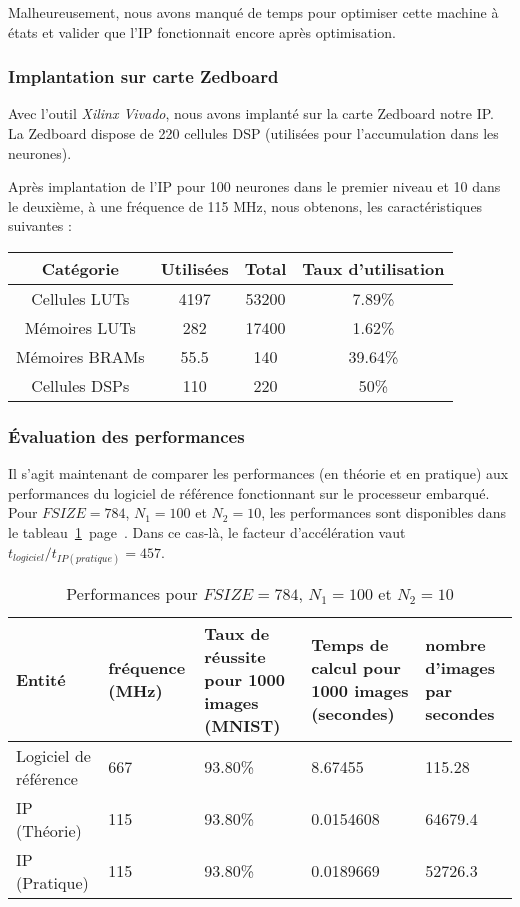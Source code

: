 Malheureusement, nous avons manqué de temps pour optimiser cette machine à états
et valider que l'IP fonctionnait encore après optimisation.

\subsubsection{Implantation sur carte Zedboard}

Avec l'outil {\em Xilinx Vivado}, nous avons implanté sur la carte Zedboard notre IP.
La Zedboard dispose de 220 cellules DSP (utilisées pour l'accumulation dans les neurones).

Après implantation de l'IP pour 100 neurones dans le premier niveau et 10 dans le deuxième,
à une fréquence de 115 MHz, nous obtenons, les caractéristiques suivantes :

\begin{table}[h!]
	\centering
	\begin{tabular}{|c|c|c|c|}
		\hline
		Catégorie & Utilisées & Total & Taux d'utilisation\\
		\hline
		Cellules LUTs & 4197 & 53200 & 7.89\% \\
		Mémoires LUTs & 282 & 17400 & 1.62\% \\
		Mémoires BRAMs & 55.5 & 140 & 39.64\% \\
		Cellules DSPs & 110 & 220 & 50\% \\
		\hline
	\end{tabular}
\end{table}


\subsubsection{\'{E}valuation des performances}

Il s'agit maintenant de comparer les performances (en théorie et en pratique)
aux performances du logiciel de référence fonctionnant sur le processeur embarqué.\\

Pour $FSIZE = 784$, $N_1 = 100$ et $N_2 = 10$, les performances sont disponibles
dans le tableau~\ref{fig:perf_100}~page~\pageref{fig:perf_100}.
Dans ce cas-là, le facteur d'accélération vaut $t_{logiciel}/t_{IP (pratique)} = 457$.\\
\begin{table}[h!]
	\centering
	\begin{tabular}{| p{} | p{} | p{} | p{} | p{} |}
		\hline
		Entité & fréquence (MHz) & Taux de réussite pour 1000 images (MNIST) & Temps de calcul pour 1000 images (secondes) & nombre d'images par secondes\\
		\hline
		Logiciel de référence & 667 & 93.80\% &  8.67455 & 115.28\\
		IP (Théorie) & 115 &  93.80\% & 0.0154608 & 64679.4\\
		IP (Pratique) & 115 &  93.80\% & 0.0189669 & 52726.3\\
		\hline
	\end{tabular}
	\caption{Performances pour $FSIZE = 784$, $N_1 = 100$ et $N_2 = 10$}
	\label{fig:perf_100}
\end{table}
